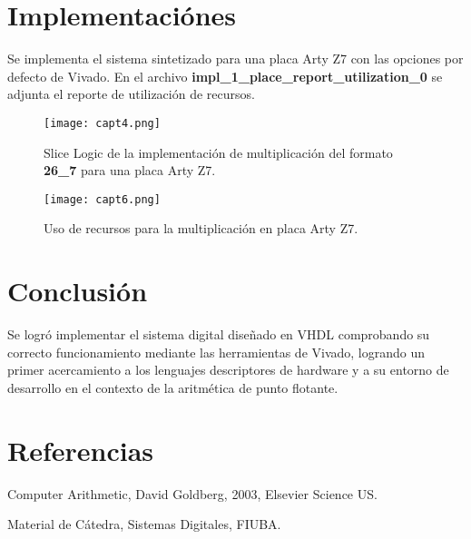 \documentclass[a4paper, 10pt, spanish]{article}
\numberwithin{equation}{section}
\numberwithin{table}{section}
\begin{document}
\section{Implementaciónes}
Se implementa el sistema sintetizado para una placa Arty Z7 con las opciones por defecto de Vivado. En el archivo \textbf{impl\_1\_place\_report\_utilization\_0} se adjunta el reporte de utilización de recursos.

\begin{figure}[h!]
\begin{center}
    \hspace{2cm}
    \texttt{[image: capt4.png]}
\end{center}
\caption{Slice Logic de la implementación de multiplicación del formato \textbf{26\_7} para una placa Arty Z7.}
\end{figure}

\begin{figure}[h!]
\begin{center}
    \hspace{2cm}
    \texttt{[image: capt6.png]}
\end{center}
\caption{Uso de recursos para la multiplicación en placa Arty Z7.}
\end{figure}

\newpage
\section{Conclusión}
Se logró implementar el sistema digital diseñado en VHDL comprobando su correcto funcionamiento mediante las herramientas de Vivado, logrando un primer acercamiento a los lenguajes descriptores de hardware y a su entorno de desarrollo en el contexto de la aritmética de punto flotante.

\section{Referencias}
\begin{enumerate}[{[}1{]}]
  \item  Computer Arithmetic, David Goldberg, 2003, Elsevier Science US.
  \item  Material de Cátedra, Sistemas Digitales, FIUBA.
\end{enumerate}
\end{document}
